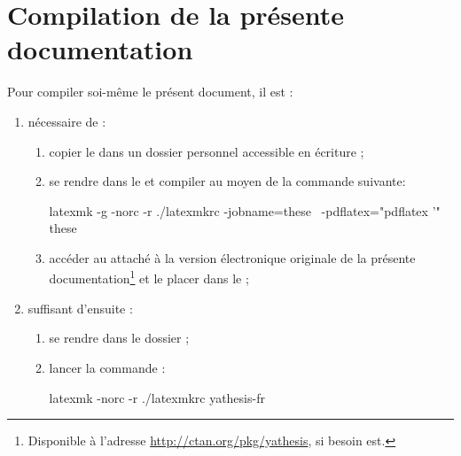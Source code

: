 \chapter{Compilation de la présente documentation}\label{cha-comp-de-la-pres}

%

Pour compiler soi-même le présent document, il est :
\begin{enumerate}
\item nécessaire de :
  \begin{enumerate}
  \item copier le  dans un
    dossier personnel accessible en écriture ;
  \item se rendre dans le  et compiler
     au moyen de la commande suivante\uneseuleligne :
\begin{listingshell}[before=\smallskip]
latexmk -g -norc -r ./latexmkrc -jobname=these \
-pdflatex="pdflatex %
\AtEndPreamble{\RequirePackage{yathesis-demo}} '" these
\end{listingshell}
%
\item accéder au  attaché à la version électronique
  originale de la présente documentation\footnote{Disponible à l'adresse
    \url{http://ctan.org/pkg/yathesis}, si besoin est.} et le placer dans le
  \Folder{../exemples} ;
\end{enumerate}
\item suffisant d'ensuite :
  \begin{enumerate}
  \item se rendre dans le dossier  ;
  \item lancer la commande :
%
\begin{listingshell}[before=\medskip]
latexmk -norc -r ./latexmkrc yathesis-fr
\end{listingshell}
%
  \end{enumerate}
\end{enumerate}

